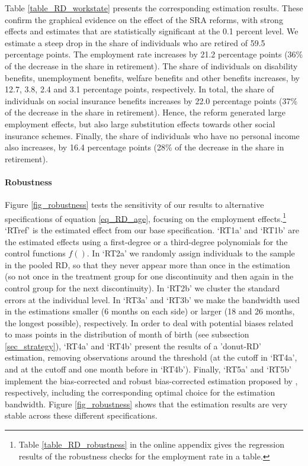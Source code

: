 \documentclass[12pt,a4paper]{article}
\begin{document}
Table \ref{table_RD_workstate} presents the corresponding estimation results. These confirm the graphical evidence on the effect of the SRA reforms, with strong effects and estimates that are statistically significant at the 0.1 percent level. We estimate a steep drop in the share of individuals who are retired of 59.5 percentage points. The employment rate increases by 21.2 percentage points (36\% of the decrease in the share in retirement). The share of individuals on disability benefits, unemployment benefits, welfare benefits and other benefits increases, by 12.7, 3.8, 2.4 and 3.1 percentage points, respectively. In total, the share of individuals on social insurance benefits increases by 22.0 percentage points (37\% of the decrease in the share in retirement).
Hence, the reform generated large employment effects, but also large substitution effects towards other social insurance schemes. Finally, the share of individuals who have no personal income also increases, by 16.4 percentage points (28\% of the decrease in the share in retirement).

\paragraph{Robustness}

Figure \ref{fig_robustness} tests the sensitivity of our results to alternative specifications of equation \ref{eq_RD_age}, focusing on the employment effects.\footnote{Table \ref{table_RD_robustness} in the online appendix gives the regression results of the robustness checks for the employment rate in a table. %
} `RTref' is the estimated effect from our base specification. `RT1a' and `RT1b' are the estimated effects using a first-degree or a third-degree polynomials for the control functions $f()$. In `RT2a' we randomly assign individuals to the sample in the pooled RD, so that they never appear more than once in the estimation (so not once in the treatment group for one discontinuity and then again in the control group for the next discontinuity). In `RT2b' we cluster the standard errors at the individual level. In `RT3a' and `RT3b' we make the bandwidth used in the estimations smaller (6 months on each side) or larger (18 and 26 months, the longest possible), respectively. In order to deal with potential biases related to mass points in the distribution of month of birth (see subsection \ref{sec_strategy}), `RT4a' and `RT4b' present the results of a 'donut-RD' estimation, removing observations around the threshold (at the cutoff in `RT4a', and at the cutoff and one month before in `RT4b'). Finally, `RT5a' and `RT5b' implement the bias-corrected and robust bias-corrected estimation %
proposed by \cite{calonico2014robust}, respectively, including the corresponding optimal choice for the estimation bandwidth. Figure \ref{fig_robustness} shows that the estimation results are very stable across these different specifications.
\end{document}
